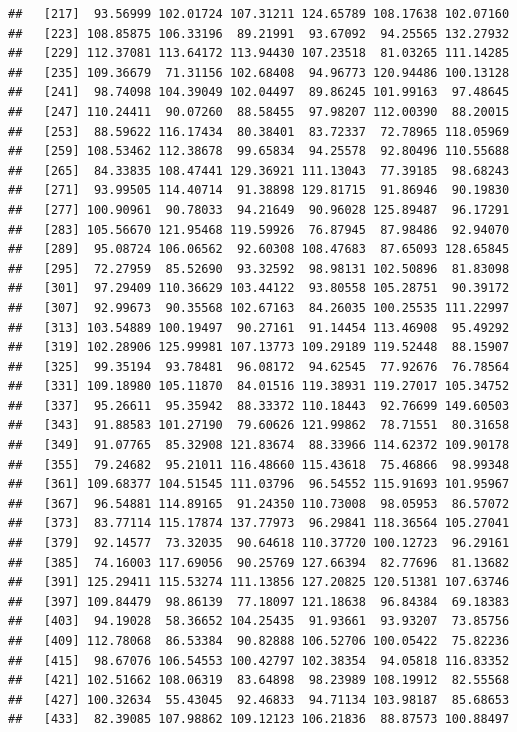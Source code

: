 \documentclass[
]{article}
\begin{document}
\begin{verbatim}
##   [217]  93.56999 102.01724 107.31211 124.65789 108.17638 102.07160
##   [223] 108.85875 106.33196  89.21991  93.67092  94.25565 132.27932
##   [229] 112.37081 113.64172 113.94430 107.23518  81.03265 111.14285
##   [235] 109.36679  71.31156 102.68408  94.96773 120.94486 100.13128
##   [241]  98.74098 104.39049 102.04497  89.86245 101.99163  97.48645
##   [247] 110.24411  90.07260  88.58455  97.98207 112.00390  88.20015
##   [253]  88.59622 116.17434  80.38401  83.72337  72.78965 118.05969
##   [259] 108.53462 112.38678  99.65834  94.25578  92.80496 110.55688
##   [265]  84.33835 108.47441 129.36921 111.13043  77.39185  98.68243
##   [271]  93.99505 114.40714  91.38898 129.81715  91.86946  90.19830
##   [277] 100.90961  90.78033  94.21649  90.96028 125.89487  96.17291
##   [283] 105.56670 121.95468 119.59926  76.87945  87.98486  92.94070
##   [289]  95.08724 106.06562  92.60308 108.47683  87.65093 128.65845
##   [295]  72.27959  85.52690  93.32592  98.98131 102.50896  81.83098
##   [301]  97.29409 110.36629 103.44122  93.80558 105.28751  90.39172
##   [307]  92.99673  90.35568 102.67163  84.26035 100.25535 111.22997
##   [313] 103.54889 100.19497  90.27161  91.14454 113.46908  95.49292
##   [319] 102.28906 125.99981 107.13773 109.29189 119.52448  88.15907
##   [325]  99.35194  93.78481  96.08172  94.62545  77.92676  76.78564
##   [331] 109.18980 105.11870  84.01516 119.38931 119.27017 105.34752
##   [337]  95.26611  95.35942  88.33372 110.18443  92.76699 149.60503
##   [343]  91.88583 101.27190  79.60626 121.99862  78.71551  80.31658
##   [349]  91.07765  85.32908 121.83674  88.33966 114.62372 109.90178
##   [355]  79.24682  95.21011 116.48660 115.43618  75.46866  98.99348
##   [361] 109.68377 104.51545 111.03796  96.54552 115.91693 101.95967
##   [367]  96.54881 114.89165  91.24350 110.73008  98.05953  86.57072
##   [373]  83.77114 115.17874 137.77973  96.29841 118.36564 105.27041
##   [379]  92.14577  73.32035  90.64618 110.37720 100.12723  96.29161
##   [385]  74.16003 117.69056  90.25769 127.66394  82.77696  81.13682
##   [391] 125.29411 115.53274 111.13856 127.20825 120.51381 107.63746
##   [397] 109.84479  98.86139  77.18097 121.18638  96.84384  69.18383
##   [403]  94.19028  58.36652 104.25435  91.93661  93.93207  73.85756
##   [409] 112.78068  86.53384  90.82888 106.52706 100.05422  75.82236
##   [415]  98.67076 106.54553 100.42797 102.38354  94.05818 116.83352
##   [421] 102.51662 108.06319  83.64898  98.23989 108.19912  82.55568
##   [427] 100.32634  55.43045  92.46833  94.71134 103.98187  85.68653
##   [433]  82.39085 107.98862 109.12123 106.21836  88.87573 100.88497

\end{verbatim}
\end{document}

